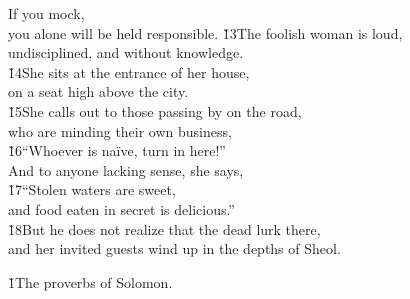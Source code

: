 \begin{poetry}
\poeml If you mock, \\
\poemll    you alone will be held responsible.
\poeml \v{13}The foolish woman is loud, \\
\poemll    undisciplined, and without knowledge. \\
\poeml \v{14}She sits at the entrance of her house, \\
\poemll    on a seat high above the city. \\
\poeml \v{15}She calls out to those passing by on the road, \\
\poemll    who are minding their own business, \\
\poeml \v{16}``Whoever is na\"{i}ve, turn in here!'' \\
\poemll    And to anyone lacking sense, she says, \\
\poeml \v{17}``Stolen waters are sweet, \\
\poemll    and food eaten in secret is delicious.'' \\
\poeml \v{18}But he does not realize that the dead lurk there, \\
\poemll    and her invited guests wind up in the depths of Sheol.
\end{poetry}

\v{1}The proverbs of Solomon.

